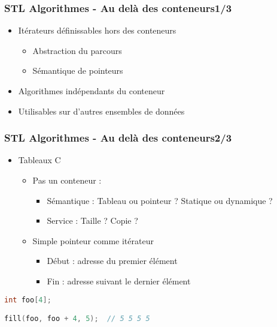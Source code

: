 \documentclass[C++.tex]{subfiles}
\begin{document}
\begin{frame}
	\frametitle{STL Algorithmes - Au delà des conteneurs\titlehfill{}1/3}
	\begin{itemize}
		\item Itérateurs définissables hors des conteneurs
		\begin{itemize}
			\item Abstraction du parcours
			\item Sémantique de pointeurs
		\end{itemize}
		\item Algorithmes indépendants du conteneur
		\item Utilisables sur d'autres ensembles de données
	\end{itemize}
\end{frame}

\begin{frame}[fragile]
	\frametitle{STL Algorithmes - Au delà des conteneurs\titlehfill{}2/3}
	\begin{itemize}
		\item Tableaux C
		\begin{itemize}
			\item Pas un conteneur :


			\begin{itemize}
				\item Sémantique : Tableau ou pointeur ? Statique ou dynamique ?
				\item Service : Taille ? Copie ?
			\end{itemize}
			\item Simple pointeur comme itérateur
			\begin{itemize}
				\item Début : adresse du premier élément
				\item Fin : adresse suivant le dernier élément
			\end{itemize}
		\end{itemize}
	\end{itemize}

	\begin{lstlisting}[language=C++]
int foo[4];

fill(foo, foo + 4, 5);  // 5 5 5 5\end{lstlisting}
\end{frame}
\end{document}

